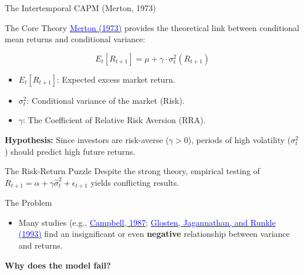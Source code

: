 \documentclass{beamer}
\begin{document}
\begin{frame}{The Intertemporal CAPM (Merton, 1973)}
    \begin{block}{The Core Theory}
        \href{https://doi.org/10.2307/1913811}{\textcolor{blue}{Merton (1973)}} provides the theoretical link between conditional mean returns and conditional variance:
        
    \end{block}

    \begin{equation}
        E_t [R_{t+1}] = \mu + \gamma \cdot \sigma_t^2 (R_{t+1})
    \end{equation}

    \begin{itemize}
        \item $E_t [R_{t+1}]$: Expected excess market return.
        \item $\sigma_t^2$: Conditional variance of the market (Risk).
        \item $\gamma$: The Coefficient of Relative Risk Aversion (RRA).
    \end{itemize}

    
    \textbf{Hypothesis:} Since investors are risk-averse ($\gamma > 0$), periods of high volatility ($\sigma_t^2$) should predict high future returns.
\end{frame}

\begin{frame}{The Risk-Return Puzzle}
    Despite the strong theory, empirical testing of $R_{t+1} = \alpha + \gamma \widehat{\sigma}_t^2 + \epsilon_{t+1}$ yields conflicting results.
    
    \begin{block}{The Problem}
        \begin{itemize}
            \item Many studies (e.g., \href{https://doi.org/10.1016/0304-405X(87)90045-6}{\textcolor{blue}{Campbell, 1987}}; \href{https://doi.org/10.1111/j.1540-6261.1993.tb05128.x}{\textcolor{blue}{Glosten, Jagannathan, and Runkle (1993)}} find an insignificant or even \textbf{negative} relationship between variance and returns.
        \end{itemize}
    \end{block}

    \textbf{Why does the model fail?}
\end{frame}
\end{document}
